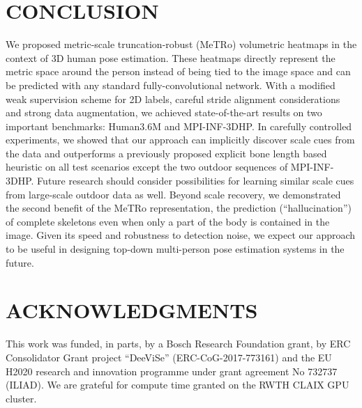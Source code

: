 \section{\uppercase{Conclusion}}
We proposed metric-scale truncation-robust (MeTRo) volumetric heatmaps in the context of 3D human pose estimation.
These heatmaps directly represent the metric space around the person instead of being tied to the image space and can be predicted with any standard fully-convolutional network.
With a modified weak supervision scheme for 2D labels, careful stride alignment considerations and strong data augmentation, we achieved state-of-the-art results on two important benchmarks: Human3.6M and MPI-INF-3DHP.
In carefully controlled experiments, we showed that our approach can implicitly discover scale cues from the data and outperforms a previously proposed explicit bone length based heuristic on all test scenarios except the two outdoor sequences of MPI-INF-3DHP. Future research should consider possibilities for learning similar scale cues from large-scale outdoor data as well.
Beyond scale recovery, we demonstrated the second benefit of the MeTRo representation, the prediction (``hallucination'') of complete skeletons even when only a part of the body is contained in the image.
Given its speed and robustness to detection noise, we expect our approach to be useful in designing top-down multi-person pose estimation systems in the future.
\addtolength{\textheight}{-2mm}   \section{\uppercase{Acknowledgments}}
This work was funded, in parts, by a Bosch Research Foundation grant, by ERC Consolidator Grant project ``DeeViSe'' (ERC-CoG-2017-773161) and the EU H2020 research and innovation programme under grant agreement No 732737 (ILIAD).
We are grateful for compute time granted on the RWTH CLAIX GPU cluster.